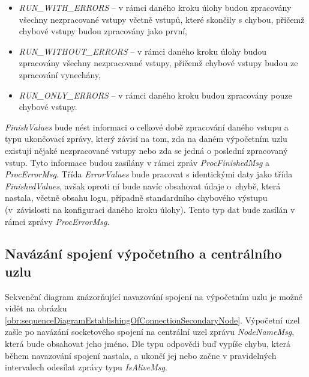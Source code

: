 \begin{itemize}
    \item \textit{RUN\_WITH\_ERRORS} -- v rámci daného kroku úlohy budou zpracovány všechny nezpracované vstupy včetně vstupů, které skončily s chybou, přičemž chybové vstupy budou zpracovány jako první,
    \item \textit{RUN\_WITHOUT\_ERRORS} -- v rámci daného kroku úlohy budou zpracovány všechny nezpracované vstupy, přičemž chybové vstupy budou ze zpracování vynechány,
    \item \textit{RUN\_ONLY\_ERRORS} -- v rámci daného kroku budou zpracovány pouze chybové vstupy.
\end{itemize}

\textit{FinishValues} bude nést informaci o celkové době zpracování daného vstupu a typu ukončovací zprávy, který závisí na tom, zda na daném výpočetním uzlu existují nějaké nezpracované vstupy nebo zda se jedná o poslední zpracovaný vstup. Tyto informace budou zasílány v rámci zpráv \textit{ProcFinishedMsg} a \textit{ProcErrorMsg}. Třída \textit{ErrorValues} bude pracovat s identickými daty jako třída \textit{FinishedValues}, avšak oproti ní bude navíc obsahovat údaje o~chybě, která nastala, včetně obsahu logu, případně standardního chybového výstupu (v~závislosti na konfiguraci daného kroku úlohy). Tento typ dat bude zasílán v rámci zprávy \textit{ProcErrorMsg}.

\subsection*{Navázání spojení výpočetního a centrálního uzlu}

Sekvenční diagram znázorňující navazování spojení na výpočetním uzlu je možné vidět na obrázku \ref{obr:sequenceDiagramEstablishingOfConnectionSecondaryNode}. Výpočetní uzel zašle po navázání socketového spojení na centrální uzel zprávu \textit{NodeNameMsg}, která bude obsahovat jeho jméno. Dle typu odpovědi buď vypíše chybu, která během navazování spojení nastala, a ukončí jej nebo začne v pravidelných intervalech odesílat zprávy typu \textit{IsAliveMsg}.


